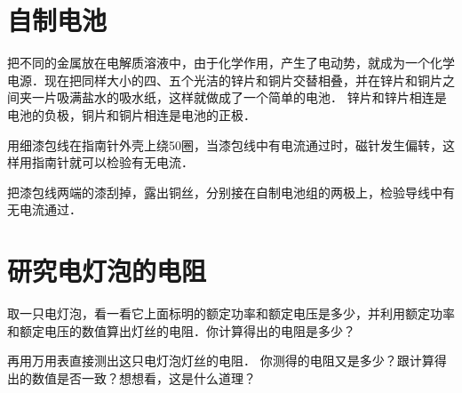 \section{自制电池}
把不同的金属放在电解质溶液中，由于化学作用，产生了电动势，就成为一个化学电源．现在把同样大小的四、五个光洁的锌片和铜片交替相叠，并在锌片和铜片之间夹一片吸满盐水的吸水纸，这样就做成了一个简单的电池．
锌片和锌片相连是电池的负极，铜片和铜片相连是电池的正极．

用细漆包线在指南针外壳上绕50圈，当漆包线中有电流通过时，磁针发生偏转，这样用指南针就可以检验有无电流．

把漆包线两端的漆刮掉，露出铜丝，分别接在自制电池组的两极上，检验导线中有无电流通过．

\section{研究电灯泡的电阻}
取一只电灯泡，看一看它上面标明的额定功率和额定电压是多少，并利用额定功率和额定电压的数值算出灯丝的电阻．你计算得出的电阻是多少？

再用万用表直接测出这只电灯泡灯丝的电阻．
你测得的电阻又是多少？跟计算得出的数值是否一致？想想看，这是什么道理？



